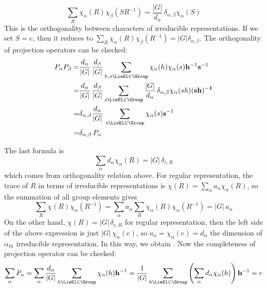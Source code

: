 \begin{equation}
  \sum_{R}\chi_\alpha(R) \chi_\beta(SR^{-1})=\frac{|G|}{d_\alpha}\,
  \delta _{\alpha,\beta} \chi_\alpha(S)
\end{equation}
This is the orthogonality between characters of irreducible
representations. If we set $S=e$, then it reduces to
$\sum_{R}\chi_\alpha(R) \chi_\beta(R^{-1})=|G|\delta _{\alpha,\beta}$.
The orthogonality of projection operators can be checked:
\begin{align*}
  P_\alpha P_\beta = & \frac{d_\alpha}{|G|}\, \frac{d_\beta}{|G|}
                       \sum_{h,s\LieEl\in\Group} \chi_\alpha (h) \chi_\alpha (s) {\bf h}^{-1} {\bf s}^{-1} \\
  = & \frac{d_\alpha}{|G|}\, \frac{d_\beta}{|G|} \sum_{s\LieEl\in\Group}
      \frac{|G|}{d_\alpha}\,\delta _{\alpha,\beta} \chi_\alpha(sh)(\bf{sh})^{-1} \\
  = &\delta _{\alpha,\beta} \frac{d_\alpha}{|G|}\,\sum_{s\LieEl\in\Group}
      \chi_\alpha(s){\bf s}^{-1} \\
  = & \delta _{\alpha,\beta}\, P_\alpha
\end{align*}

The last formula is
\begin{equation}
  \sum_\alpha d_\alpha \chi_\alpha (R) = |G|\, \delta_{e,R}
  \label{eq:groupcomplete}
\end{equation}
which comes from orthogonality relation above. For regular representation,
the trace of $R$ in terms of irreducible representations is
$\chi (R)=\sum_\alpha a_\alpha \chi_\alpha (R)$, so the summation of all group
elements gives
\[
  \sum_{R}\chi (R)\chi_\alpha (R^{-1})=\sum_\alpha a_\alpha \sum_{R}
  \chi_\alpha (R) \chi_\alpha (R^{-1}) =|G|\, a_\alpha
\]
On the other hand, $\chi (R)=|G|\, \delta_{e,R}$ for regular representation,
then the left side of the above expression is just $|G|\,\chi_\alpha (e)$,
so $a_\alpha =\chi_\alpha (e) =d_\alpha $ the dimension of $\alpha_{th}$
irreducible representation. In this way, we obtain .
Now the completeness of projection operator can be checked:
\[
  \sum_\alpha P_\alpha = \sum_\alpha \frac{d_\alpha}{|G|} \sum_{h\LieEl\in\Group}
  \chi_\alpha (h)  {\bf h}^{-1}
  =\frac{1}{|G|} \sum_{h\LieEl\in\Group} \left(\sum_\alpha d_\alpha \chi_\alpha (h)
  \right){\bf h}^{-1}
  =e
\]
